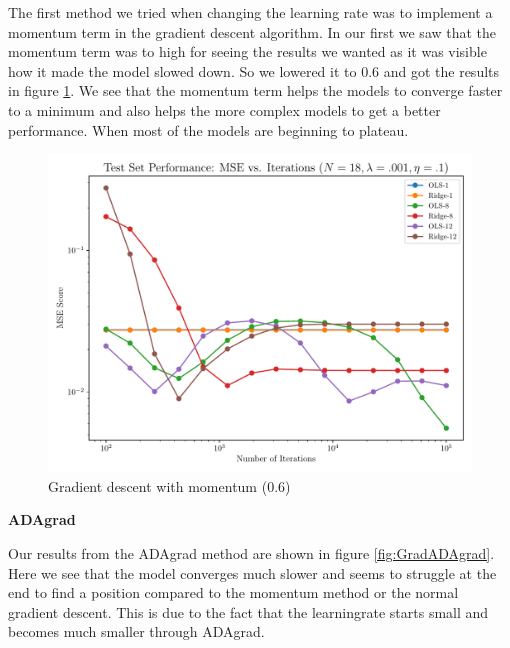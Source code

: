 \documentclass[amssymb,twocolumn,aps]{revtex4}
\begin{document}
The first method we tried when changing the learning rate was to implement a momentum term in the gradient descent algorithm.
In our first we saw that the momentum term was to high for seeing the results we wanted as it was visible how it made the model slowed down.
So we lowered it to 0.6 and got the results in figure \ref{fig:GradMomentum}.
We see that the momentum term helps the models to converge faster to a minimum and also helps the more complex models to get a better performance.
When most of the models are beginning to plateau.
\\
\begin{figure}[h]
    \centering
    \includegraphics[width=.95 \linewidth]{Figures/OLS_Ridge_Momentum.pdf}
    \caption{Gradient descent with momentum (0.6)}
    \label{fig:GradMomentum}
\end{figure}


\textbf{ADAgrad}

Our results from the ADAgrad method are shown in figure \ref{fig:GradADAgrad}.
Here we see that the model converges much slower and seems to struggle at the end to find a position compared to the momentum method or the normal gradient descent.
This is due to the fact that the learningrate starts small and becomes much smaller through ADAgrad.
\\
\end{document}
